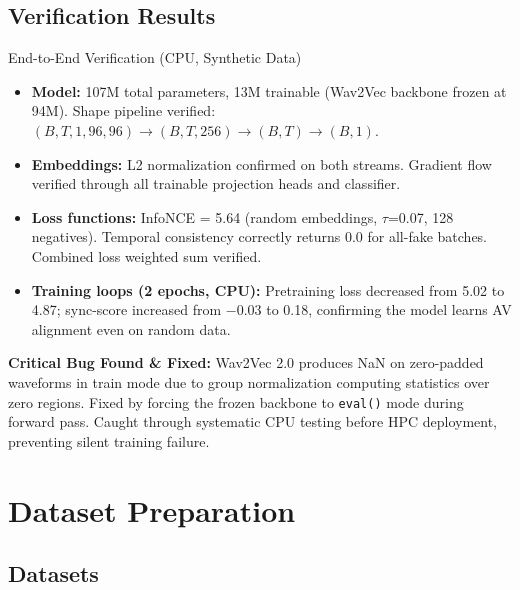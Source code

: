\documentclass[12pt, letterpaper]{article}
\begin{document}
\subsection{Verification Results}

\begin{resultbox}{End-to-End Verification (CPU, Synthetic Data)}
\begin{itemize}[leftmargin=1.5em, topsep=0pt]
    \item \textbf{Model:} 107M total parameters, 13M trainable (Wav2Vec backbone frozen at 94M). Shape pipeline verified: $(B, T, 1, 96, 96) \rightarrow (B, T, 256) \rightarrow (B, T) \rightarrow (B, 1)$.
    \item \textbf{Embeddings:} L2 normalization confirmed on both streams. Gradient flow verified through all trainable projection heads and classifier.
    \item \textbf{Loss functions:} InfoNCE = 5.64 (random embeddings, $\tau$=0.07, 128 negatives). Temporal consistency correctly returns 0.0 for all-fake batches. Combined loss weighted sum verified.
    \item \textbf{Training loops (2 epochs, CPU):} Pretraining loss decreased from 5.02 to 4.87; sync-score increased from $-$0.03 to 0.18, confirming the model learns AV alignment even on random data.
\end{itemize}
\end{resultbox}

\begin{notebox}
\textbf{Critical Bug Found \& Fixed:} Wav2Vec 2.0 produces NaN on zero-padded waveforms in train mode due to group normalization computing statistics over zero regions. Fixed by forcing the frozen backbone to \texttt{eval()} mode during forward pass. Caught through systematic CPU testing before HPC deployment, preventing silent training failure.
\end{notebox}

\section{Dataset Preparation}

\subsection{Datasets}
\end{document}
